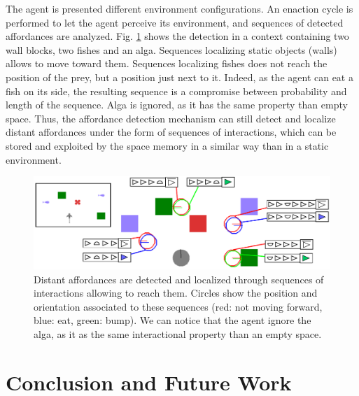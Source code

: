 \documentclass[conference]{IEEEtran}
\begin{document}
The agent is presented different environment configurations. An enaction cycle is performed to let the agent perceive its environment, %
and sequences of detected affordances are analyzed.
Fig. \ref{fig:detect} shows the detection in a context containing two wall blocks, two fishes and an alga. Sequences localizing static objects (walls) allows to move toward them. Sequences localizing fishes does not reach the position of the prey, but a position just next to it. Indeed, as the agent can eat a fish on its side, %
the resulting sequence is a compromise between probability and length of the sequence. Alga is ignored, as it has the same property than empty space. Thus, the affordance detection mechanism can still detect and localize distant affordances under the form of sequences of interactions, which can be stored and exploited by the space memory in a similar way than in a static environment.



\begin{figure}[htbp]
\centerline{\includegraphics[scale=0.4]{img/detection.pdf}}
\caption{Distant affordances are detected and localized through sequences of interactions allowing to reach them. Circles show the position and orientation associated to these sequences (red: not moving forward, blue: eat, green: bump). We can notice that the agent ignore the alga, as it as the same interactional property than an empty space.}
\label{fig:detect}
\end{figure}


\section{Conclusion and Future Work}\label{conclusion}
\end{document}

